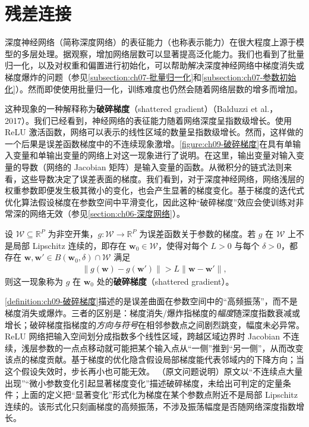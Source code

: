 \documentclass[../../main.tex]{subfiles}
\begin{document}
\section{残差连接}\label{section:ch09-残差连接}

深度神经网络（简称深度网络）的表征能力（也称表示能力）在很大程度上源于模型的多层处理。据观察，增加网络层数可以显著提高泛化能力。我们也看到了批量归一化，以及对权重和偏置进行初始化，可以帮助解决深度神经网络中梯度消失或梯度爆炸的问题（参见\cref{subsection:ch07-批量归一化}和\cref{subsection:ch07-参数初始化}）。然而即使使用批量归一化，训练难度也仍然会随着网络层数的增多而增加。

这种现象的一种解释称为\textbf{破碎梯度}（shattered gradient）（Balduzzi et al.，2017）。我们已经看到，神经网络的表征能力随着网络深度呈指数级增长。使用 ReLU 激活函数，网络可以表示的线性区域的数量呈指数级增长。然而，这样做的一个后果是误差函数梯度中的不连续现象激增。\cref{figure:ch09-破碎梯度}在具有单输入变量和单输出变量的网络上对这一现象进行了说明。在这里，输出变量对输入变量的导数（网络的 Jacobian 矩阵）是输入变量的函数。从微积分的链式法则来看，这些导数决定了误差表面的梯度。我们看到，对于深度神经网络，网络浅层的权重参数即便发生极其微小的变化，也会产生显著的梯度变化。基于梯度的迭代式优化算法假设梯度在参数空间中平滑变化，因此这种“破碎梯度”效应会使训练对非常深的网络无效（参见\cref{section:ch06-深度网络}）。

\begin{definition}[破碎梯度]\label{definition:ch09-破碎梯度}
设 $\mathcal{W}\subseteq\mathbb{R}^{P}$ 为非空开集，$g:\mathcal{W}\to\mathbb{R}^{P}$ 为误差函数关于参数的梯度。若 $g$ 在 $\mathcal{W}$ 上不是局部 Lipschitz 连续的，即存在 $\boldsymbol{w}_{0}\in\mathcal{W}$，使得对每个 $L>0$ 与每个 $\delta>0$，都存在 $\boldsymbol{w},\boldsymbol{w}'\in B(\boldsymbol{w}_{0},\delta)\cap\mathcal{W}$ 满足
\begin{align*}
\|g(\boldsymbol{w})-g(\boldsymbol{w}')\|>L\|\boldsymbol{w}-\boldsymbol{w}'\|,
\end{align*}
则这一现象称为 $g$ 在 $\boldsymbol{w}_{0}$ 处的\textbf{破碎梯度}（shattered gradient）。
\end{definition}

\begin{remark}\cref{definition:ch09-破碎梯度}描述的是误差曲面在参数空间中的“高频振荡”，而不是梯度消失或爆炸。三者的区别是：梯度消失/爆炸指梯度的\emph{幅度}随深度指数衰减或增长；破碎梯度指梯度的\emph{方向与符号}在相邻参数点之间剧烈跳变，幅度未必异常。ReLU 网络把输入空间划分成指数多个线性区域，跨越区域边界时 Jacobian 不连续，浅层参数的一点点移动就可能把某个输入点从“一侧”推到“另一侧”，从而改变该点的梯度贡献。基于梯度的优化隐含假设局部梯度能代表邻域内的下降方向；当这个假设失效时，步长再小也可能无效。
（原文问题说明）原文以“不连续点大量出现”“微小参数变化引起显著梯度变化”描述破碎梯度，未给出可判定的定量条件；上面的定义把“显著变化”形式化为梯度在某个参数点附近不是局部 Lipschitz 连续的。该形式化只刻画梯度的高频振荡，不涉及振荡幅度是否随网络深度指数增长。
\end{remark}
\end{document}
